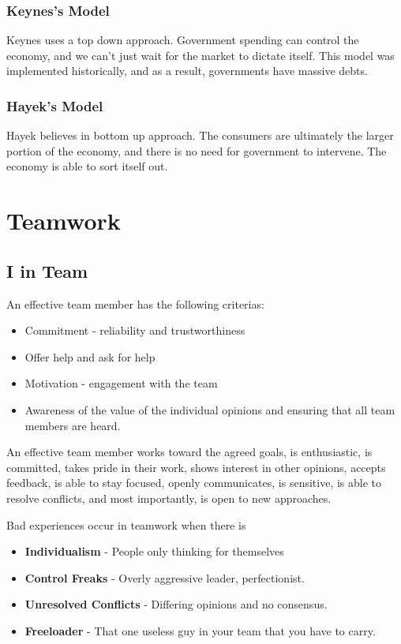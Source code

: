 \documentclass[english, 12pt]{article}
\begin{document}
\subsubsection*{Keynes's Model}
Keynes uses a top down approach. Government spending can control the economy, and we can't just wait for the market to dictate itself. This model was implemented historically, and as a result, governments have massive debts.
\subsubsection*{Hayek's Model}
Hayek believes in bottom up approach. The consumers are ultimately the larger portion of the economy, and there is no need for government to intervene. The economy is able to sort itself out.
\section{Teamwork}
\subsection{I in Team}
An effective team member has the following criterias: 
\begin{itemize}
\item Commitment -  reliability and trustworthiness
\item Offer help and ask for help
\item Motivation - engagement with the team
\item Awareness of the value of the individual opinions and ensuring that all team members are heard.
\end{itemize}
An effective team member works toward the agreed goals, is enthusiastic, is committed, takes pride in their work, shows interest in other opinions, accepts feedback, is able to stay focused, openly communicates, is sensitive, is able to resolve conflicts, and most importantly, is open to new approaches.
\begin{note}
Bad experiences occur in teamwork when there is
\begin{itemize}
\item \textbf{Individualism} - People only thinking for themselves
\item \textbf{Control Freaks} - Overly aggressive leader, perfectionist.
\item \textbf{Unresolved Conflicts} - Differing opinions and no consensus.
\item \textbf{Freeloader} - That one useless guy in your team that you have to carry.
\end{itemize}
\end{note}
\end{document}
